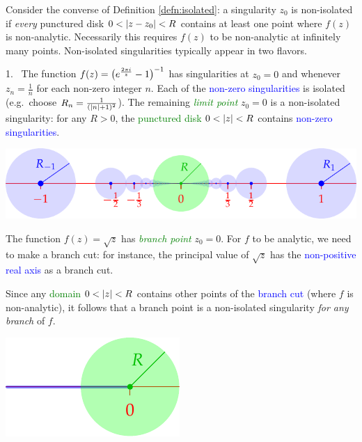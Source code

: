 \goodbreak


Consider the converse of Definition \ref{defn:isolated}: a singularity $z_0$ is non-isolated if \emph{every} punctured disk $0<\left| z-z_0\right|<R$ contains at least one point where $f(z)$ is non-analytic. Necessarily this requires $f(z)$ to be non-analytic at infinitely many points. Non-isolated singularities typically appear in two flavors.

\begin{examples}{}{}
\hangindent\leftmargini
\textup{1.} \ The function $f(z)=\bigl(e^{\frac{2\pi i}{z}}-1\bigr)^{-1}$ has singularities at $z_0=0$ and whenever $z_n=\frac 1n$ for each non-zero integer $n$. Each of the \textcolor{blue}{non-zero singularities} is isolated (e.g.\ choose \textcolor{blue}{$R_n=\frac 1{(\left| n\right|+1)^2}$}). The remaining \textcolor{Green}{\emph{limit point}} $z_0=0$ is a non-isolated singularity: for any $R>0$, the \textcolor{Green}{punctured disk $0<\left| z\right|<R$} contains \textcolor{blue}{non-zero singularities}.
\begin{center}
\includegraphics{sing1}
\end{center}

\begin{enumerate}\setcounter{enumi}{1}
\begin{minipage}[t]{0.7\linewidth}\vspace{0pt}
  \item The function $f(z)=\sqrt z$ has \textcolor{Green}{\emph{branch point}} $z_0=0$. For $f$ to be analytic, we need to make a branch cut: for instance, the principal value of $\sqrt z$ has the \textcolor{blue}{non-positive real axis} as a branch cut.\par
  Since any \textcolor{Green}{domain $0<\left| z\right|<R$} contains other points of the \textcolor{blue}{branch cut} (where $f$ is non-analytic), it follows that a branch point is a non-isolated singularity \emph{for any branch} of $f$.\par
\end{minipage}\begin{minipage}[t]{0.3\linewidth}\vspace{10pt}
\flushright\includegraphics{sing2}
\end{minipage}
\end{enumerate}
\end{examples}

